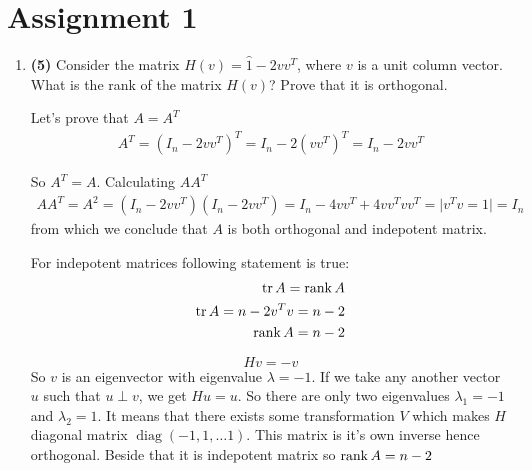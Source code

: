 
\section*{Assignment 1}

\maketitle

\begin{enumerate}

\item \textbf{(5)} Consider the matrix $H(v)=\hat 1 - 2 v v^T$, where $v$ is a unit column vector. What is the rank of the matrix $H(v)$? Prove that it is orthogonal.

\begin{solution}
    Let's prove that $A = A^{T}$
    \begin{eqnarray*}
        A^{T} = \left(I_{n} - 2 v v^{T}\right)^{T} = I_{n} - 2 (v v^{T})^{T} =  I_{n} - 2 v v^{T}
    \end{eqnarray*}

    So $A^{T} = A$. Calculating $AA^{T}$ 
    \begin{eqnarray*}
        AA^{T} = A^{2} = \left(I_{n} - 2 v v^{T}\right)\left(I_{n} - 2 v v^{T}\right) = I_{n} - 4vv^{T} + 4vv^{T}vv^{T} = \lvert v^{T} v = 1\rvert  = I_{n}
    \end{eqnarray*} 
    from which we conclude that $A$ is both orthogonal and indepotent matrix.

    For indepotent matrices following statement is true: 
    \begin{eqnarray*}
        \operatorname{tr} A  = \operatorname{rank} A \\
        \operatorname{tr} A = n - 2v^{T}v =  n - 2 \\
        \operatorname{rank} A = n - 2
    \end{eqnarray*}
\end{solution}

\begin{solution}
    \begin{equation*}
        H v = - v
    \end{equation*}
    So $v$ is an eigenvector with eigenvalue $\lambda = - 1$. 
    If we take any another vector $u$ such that $u \perp v$, we get $H u = u$. So there are only two eigenvalues $\lambda_{1} = -1$ and $\lambda_{2} = 1$. 
    It means that there exists some transformation $V$ which makes $H$ diagonal matrix $\operatorname*{diag}\left(- 1, 1, \dots 1\right)$. This matrix is it's own inverse
    hence orthogonal. Beside that it is indepotent matrix so $\operatorname{rank} A = n - 2$
\end{solution}



\end{enumerate}
